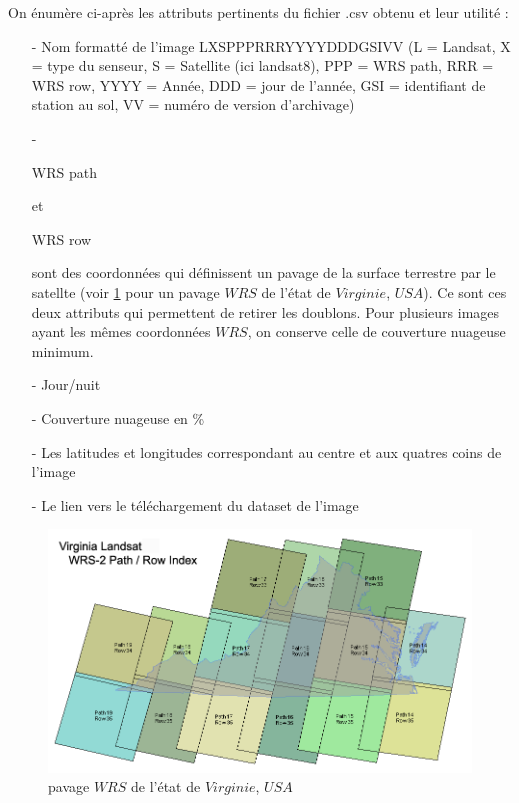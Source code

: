 \documentclass{book}
\begin{document}
On énumère ci-après les attributs pertinents du fichier .csv obtenu et leur utilité :\\

\begin{itemize}

\item[-] Nom formatté de l'image LXSPPPRRRYYYYDDDGSIVV (L = Landsat, X = type du senseur, S = Satellite (ici landsat8),
PPP = WRS path, RRR = WRS row, YYYY = Année, DDD = jour de l'année, GSI = identifiant de station au sol, 
VV = numéro de version d'archivage)
\item[-] \begin{itshape}WRS path\end{itshape} et \begin{itshape}WRS row\end{itshape} sont des coordonnées qui définissent un pavage de la surface terrestre par le satellte (voir \ref{wrs}
pour un pavage $WRS$ de l'état de $Virginie$, $USA$). Ce sont ces deux attributs qui permettent de retirer les doublons. Pour
plusieurs images ayant les mêmes coordonnées $WRS$, on conserve celle de couverture nuageuse minimum.
\item[-] Jour/nuit
\item[-] Couverture nuageuse en \%
\item[-] Les latitudes et longitudes correspondant au centre et aux quatres coins de l'image
\item[-] Le lien vers le téléchargement du dataset de l'image

\end{itemize}

\begin{figure}[H]
\begin{center}
\includegraphics[scale=0.4]{images/wrs.png}
\end{center}
\caption{pavage $WRS$ de l'état de $Virginie$, $USA$ \cite{Virginia}}
\label{wrs}
\end{figure}
\end{document}

